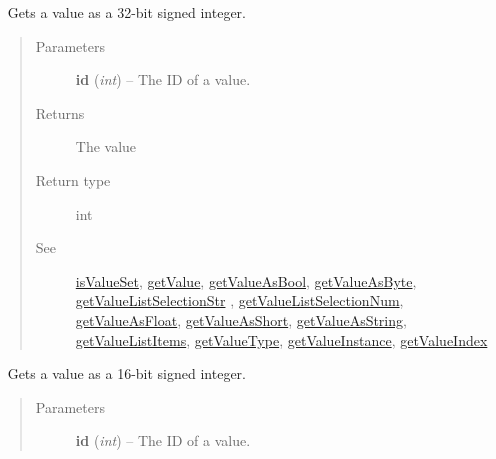 \documentclass[letterpaper,10pt,english]{sphinxmanual}
\begin{document}
\begin{fulllineitems}
\begin{fulllineitems}
\begin{quote}
\begin{description}
\end{description}\end{quote}

\end{fulllineitems}


\begin{fulllineitems}
\label{libopenzwave:libopenzwave.PyManager.getValueAsInt}~\label{libopenzwave:getvalueasint}
Gets a value as a 32-bit signed integer.
\begin{quote}\begin{description}
\item[{Parameters}] \leavevmode
\textbf{id} (\emph{int}) -- The ID of a value.

\item[{Returns}] \leavevmode
The value

\item[{Return type}] \leavevmode
int

\item[{See}] \leavevmode
{\hyperref[libopenzwave:isvalueset]{isValueSet}}, {\hyperref[libopenzwave:getvalue]{getValue}}, {\hyperref[libopenzwave:getvalueasbool]{getValueAsBool}}, {\hyperref[libopenzwave:getvalueasbyte]{getValueAsByte}}, {\hyperref[libopenzwave:getvaluelistselectionstr]{getValueListSelectionStr}} , {\hyperref[libopenzwave:getvaluelistselectionnum]{getValueListSelectionNum}}, {\hyperref[libopenzwave:getvalueasfloat]{getValueAsFloat}}, {\hyperref[libopenzwave:getvalueasshort]{getValueAsShort}}, {\hyperref[libopenzwave:getvalueasstring]{getValueAsString}}, {\hyperref[libopenzwave:getvaluelistitems]{getValueListItems}}, {\hyperref[libopenzwave:getvaluetype]{getValueType}}, {\hyperref[libopenzwave:getvalueinstance]{getValueInstance}}, {\hyperref[libopenzwave:getvalueindex]{getValueIndex}}

\end{description}\end{quote}

\end{fulllineitems}


\begin{fulllineitems}
\label{libopenzwave:libopenzwave.PyManager.getValueAsShort}~\label{libopenzwave:getvalueasshort}
Gets a value as a 16-bit signed integer.
\begin{quote}\begin{description}
\item[{Parameters}] \leavevmode
\textbf{id} (\emph{int}) -- The ID of a value.


\end{description}
\end{quote}
\end{fulllineitems}
\end{fulllineitems}
\end{document}
